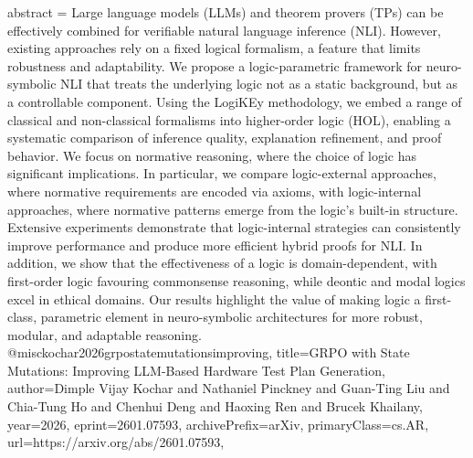 {      abstract = {Large language models (LLMs) and theorem provers (TPs) can be effectively combined for verifiable natural language inference (NLI). However, existing approaches rely on a fixed logical formalism, a feature that limits robustness and adaptability. We propose a logic-parametric framework for neuro-symbolic NLI that treats the underlying logic not as a static background, but as a controllable component. Using the LogiKEy methodology, we embed a range of classical and non-classical formalisms into higher-order logic (HOL), enabling a systematic comparison of inference quality, explanation refinement, and proof behavior. We focus on normative reasoning, where the choice of logic has significant implications. In particular, we compare logic-external approaches, where normative requirements are encoded via axioms, with logic-internal approaches, where normative patterns emerge from the logic's built-in structure. Extensive experiments demonstrate that logic-internal strategies can consistently improve performance and produce more efficient hybrid proofs for NLI. In addition, we show that the effectiveness of a logic is domain-dependent, with first-order logic favouring commonsense reasoning, while deontic and modal logics excel in ethical domains. Our results highlight the value of making logic a first-class, parametric element in neuro-symbolic architectures for more robust, modular, and adaptable reasoning.}
}@misc{kochar2026grpostatemutationsimproving,
      title={GRPO with State Mutations: Improving LLM-Based Hardware Test Plan Generation}, 
      author={Dimple Vijay Kochar and Nathaniel Pinckney and Guan-Ting Liu and Chia-Tung Ho and Chenhui Deng and Haoxing Ren and Brucek Khailany},
      year={2026},
      eprint={2601.07593},
      archivePrefix={arXiv},
      primaryClass={cs.AR},
      url={https://arxiv.org/abs/2601.07593},
}
